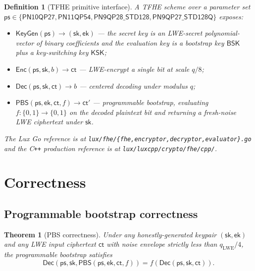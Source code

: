 \documentclass[11pt,a4paper]{article}
\newtheorem{theorem}{Theorem}[section]
\newtheorem{definition}{Definition}[section]
\begin{document}
\begin{definition}[TFHE primitive interface]\label{def:tfhe-iface}
A TFHE scheme over a parameter set $\mathsf{ps} \in
\{\textsf{PN10QP27}, \textsf{PN11QP54}, \textsf{PN9QP28\_STD128},
\textsf{PN9QP27\_STD128Q}\}$ exposes:
\begin{itemize}
\item $\mathsf{KeyGen}(\mathsf{ps}) \to (\mathsf{sk}, \mathsf{ek})$
  --- the secret key is an LWE-secret polynomial-vector of
  binary coefficients and the evaluation key is a bootstrap key
  $\mathsf{BSK}$ plus a key-switching key $\mathsf{KSK}$;
\item $\mathsf{Enc}(\mathsf{ps}, \mathsf{sk}, b) \to \mathsf{ct}$
  --- LWE-encrypt a single bit at scale $q/8$;
\item $\mathsf{Dec}(\mathsf{ps}, \mathsf{sk}, \mathsf{ct}) \to b$
  --- centered decoding under modulus $q$;
\item $\mathsf{PBS}(\mathsf{ps}, \mathsf{ek}, \mathsf{ct}, f) \to
  \mathsf{ct}'$ --- programmable bootstrap, evaluating
  $f : \{0,1\} \to \{0,1\}$ on the decoded plaintext bit and
  returning a fresh-noise LWE ciphertext under $\mathsf{sk}$.
\end{itemize}
The Lux Go reference is at
\texttt{lux/fhe/\{fhe,encryptor,decryptor,evaluator\}.go} and the
C\texttt{++} production reference is at
\texttt{lux/luxcpp/crypto/fhe/cpp/}.
\end{definition}

\section{Correctness}\label{sec:correctness}

\subsection{Programmable bootstrap correctness}

\begin{theorem}[PBS correctness]\label{thm:pbs}
Under any honestly-generated keypair $(\mathsf{sk}, \mathsf{ek})$ and
any LWE input ciphertext $\mathsf{ct}$ with noise envelope strictly
less than $q_{\mathrm{LWE}}/4$, the programmable bootstrap satisfies
\[
  \mathsf{Dec}(\mathsf{ps}, \mathsf{sk},
    \mathsf{PBS}(\mathsf{ps}, \mathsf{ek}, \mathsf{ct}, f))
  = f(\mathsf{Dec}(\mathsf{ps}, \mathsf{sk}, \mathsf{ct})).
\]
\end{theorem}
\end{document}
